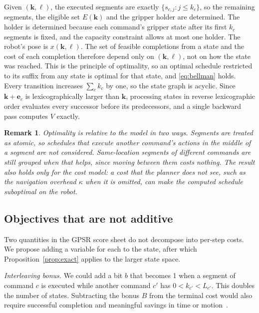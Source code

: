 \documentclass[conference]{IEEEtran}
\newcommand{\todo}[1]{}
\newcommand{\todo}[1]{\textcolor{red}{[TODO: #1]}}
\newtheorem{remark}{Remark}
\begin{document}
\begin{IEEEproof}
Given $(\mathbf{k},\ell)$, the executed segments are exactly
$\{s_{c,j}: j\le k_c\}$, so the remaining segments, the eligible set
$E(\mathbf{k})$ and the gripper holder are determined. The holder is
determined because each command's gripper state after its first $k_c$ segments
is fixed, and the capacity constraint allows at most one holder. The robot's
pose is $x(\mathbf{k},\ell)$. The set of feasible completions from a state and
the cost of each completion therefore depend only on $(\mathbf{k},\ell)$, not on
how the state was reached. This is the principle of optimality, so an optimal
schedule restricted to its suffix from any state is optimal for that state, and
\eqref{eq:bellman} holds. Every transition increases $\sum_c k_c$ by one, so the
state graph is acyclic. Since $\mathbf{k}+\mathbf{e}_c$ is lexicographically
larger than $\mathbf{k}$, processing states in reverse lexicographic order
evaluates every successor before its predecessors, and a single backward pass
computes $V$ exactly.
\end{IEEEproof}

\begin{remark}
Optimality is relative to the model in two ways. Segments are treated as atomic,
so schedules that execute another command's actions in the middle of a segment
are not considered. Same-location segments of different commands are still
grouped when that helps, since moving between them costs nothing. The result
also holds only for the cost model: a cost that the planner does not see, such
as the navigation overhead $\kappa$ when it is omitted, can make the computed
schedule suboptimal on the robot.
\end{remark}

\subsection{Objectives that are not additive}
Two quantities in the GPSR score sheet do not decompose into per-step costs.
We propose adding a variable for each to the state, after which
Proposition~\ref{prop:exact} applies to the larger state space.

\emph{Interleaving bonus.} We could add a bit $b$ that becomes 1 when a
segment of command $c$ is executed while another command $c'$ has
$0<k_{c'}<L_{c'}$. This doubles the number of states. Subtracting
the bonus $B$ from the terminal cost would also require successful
completion and meaningful savings in time or motion~\cite{rulebook}.
\todo{Confirm what counts as meaningful interleaving.}
\end{document}
